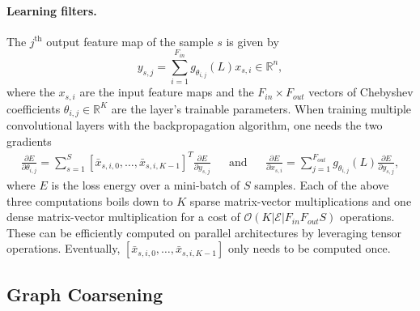\documentclass{article}
\newcommand{\E}{\mathcal{E}}
\newcommand{\bO}{\mathcal{O}}
\newcommand{\R}{\mathbb{R}}
\begin{document}
\paragraph{Learning filters.} The $j^\text{th}$ output feature map of the sample
$s$ is given by
\begin{equation} \label{eq:filterbank}
	y_{s,j} = \sum_{i=1}^{F_{in}} g_{\theta_{i,j}}(L) x_{s,i} \in \R^n,
\end{equation}
where the $x_{s,i}$ are the input feature maps and the $F_{in} \times F_{out}$
vectors of Chebyshev coefficients $\theta_{i,j} \in \R^K$ are the layer's
trainable parameters. When training multiple convolutional layers with the
backpropagation algorithm, one needs the two gradients
\begin{align}
	\frac{\partial E}{\partial \theta_{i,j}} =
	\sum_{s=1}^S [\bar{x}_{s,i,0}, \ldots, \bar{x}_{s,i,K-1}]^T
	\frac{\partial E}{\partial y_{s,j}}
	&& \text{and} &&
	\frac{\partial E}{\partial x_{s,i}} =
	\sum_{j=1}^{F_{out}} g_{\theta_{i,j}}(L)
	\frac{\partial E}{\partial y_{s,j}},
\end{align}
where $E$ is the loss energy over a mini-batch of $S$ samples. Each of the
above three computations boils down to $K$ sparse matrix-vector multiplications
and one dense matrix-vector multiplication for a cost of $\bO(K |\E| F_{in}
F_{out} S)$ operations. These can be efficiently computed on parallel
architectures by leveraging tensor operations. Eventually, $[\bar{x}_{s,i,0},
\ldots, \bar{x}_{s,i,K-1}]$ only needs to be computed once.

\subsection{Graph Coarsening} \label{sec:coarsening}

\end{document}
